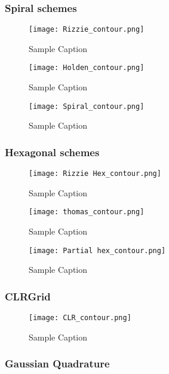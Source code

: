 \documentclass{article}
\begin{document}
\subsubsection{Spiral schemes}
\begin{figure}[ht]
    \centering
    \texttt{[image: Rizzie\_contour.png]}
    \caption{Sample Caption}
\end{figure}


\begin{figure}[ht]
    \centering
    \texttt{[image: Holden\_contour.png]}
    \caption{Sample Caption}
\end{figure}

\begin{figure}[ht]
    \centering
    \texttt{[image: Spiral\_contour.png]}
    \caption{Sample Caption}
\end{figure}


\subsubsection{Hexagonal schemes}
\begin{figure}[ht]
    \centering
    \texttt{[image: Rizzie Hex\_contour.png]}
    \caption{Sample Caption}
\end{figure}


\begin{figure}[ht]
    \centering
    \texttt{[image: thomas\_contour.png]}
    \caption{Sample Caption}
\end{figure}


\begin{figure}[ht]
    \centering
    \texttt{[image: Partial hex\_contour.png]}
    \caption{Sample Caption}
\end{figure}


\subsubsection{CLRGrid}

\begin{figure}[ht]
    \centering
    \texttt{[image: CLR\_contour.png]}
    \caption{Sample Caption}
\end{figure}


\subsubsection{Gaussian Quadrature}
\end{document}
